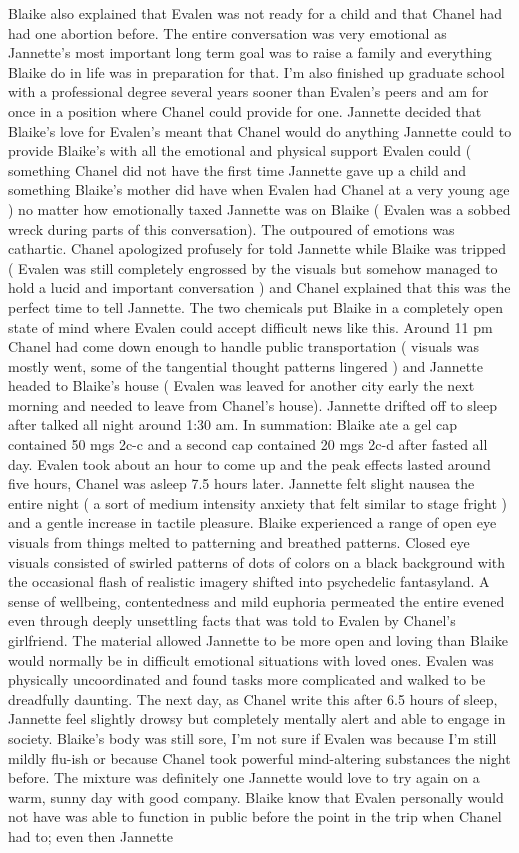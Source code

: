 \documentclass[12pt]{book}
\begin{document}
Blaike also explained that Evalen was not ready for a child and that Chanel had had one abortion before. The entire conversation was very emotional as Jannette's most important long term goal was to raise a family and everything Blaike do in life was in preparation for that. I'm also finished up graduate school with a professional degree several years sooner than Evalen's peers and am for once in a position where Chanel could provide for one. Jannette decided that Blaike's love for Evalen's meant that Chanel would do anything Jannette could to provide Blaike's with all the emotional and physical support Evalen could ( something Chanel did not have the first time Jannette gave up a child and something Blaike's mother did have when Evalen had Chanel at a very young age ) no matter how emotionally taxed Jannette was on Blaike ( Evalen was a sobbed wreck during parts of this conversation). The outpoured of emotions was cathartic. Chanel apologized profusely for told Jannette while Blaike was tripped ( Evalen was still completely engrossed by the visuals but somehow managed to hold a lucid and important conversation ) and Chanel explained that this was the perfect time to tell Jannette. The two chemicals put Blaike in a completely open state of mind where Evalen could accept difficult news like this. Around 11 pm Chanel had come down enough to handle public transportation ( visuals was mostly went, some of the tangential thought patterns lingered ) and Jannette headed to Blaike's house ( Evalen was leaved for another city early the next morning and needed to leave from Chanel's house). Jannette drifted off to sleep after talked all night around 1:30 am. In summation: Blaike ate a gel cap contained 50 mgs 2c-c and a second cap contained 20 mgs 2c-d after fasted all day. Evalen took about an hour to come up and the peak effects lasted around five hours, Chanel was asleep 7.5 hours later. Jannette felt slight nausea the entire night ( a sort of medium intensity anxiety that felt similar to stage fright ) and a gentle increase in tactile pleasure. Blaike experienced a range of open eye visuals from things melted to patterning and breathed patterns. Closed eye visuals consisted of swirled patterns of dots of colors on a black background with the occasional flash of realistic imagery shifted into psychedelic fantasyland. A sense of wellbeing, contentedness and mild euphoria permeated the entire evened even through deeply unsettling facts that was told to Evalen by Chanel's girlfriend. The material allowed Jannette to be more open and loving than Blaike would normally be in difficult emotional situations with loved ones. Evalen was physically uncoordinated and found tasks more complicated and walked to be dreadfully daunting. The next day, as Chanel write this after 6.5 hours of sleep, Jannette feel slightly drowsy but completely mentally alert and able to engage in society. Blaike's body was still sore, I'm not sure if Evalen was because I'm still mildly flu-ish or because Chanel took powerful mind-altering substances the night before. The mixture was definitely one Jannette would love to try again on a warm, sunny day with good company. Blaike know that Evalen personally would not have was able to function in public before the point in the trip when Chanel had to; even then Jannette 
\end{document}
